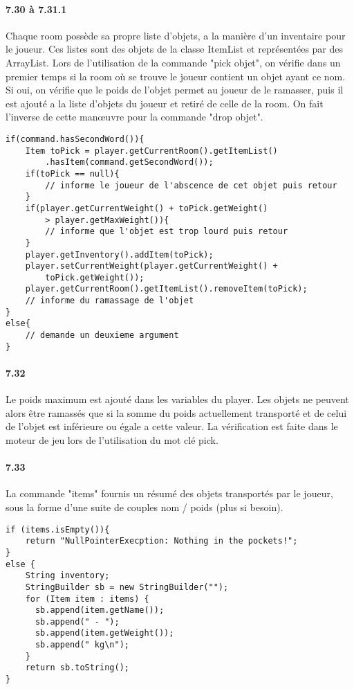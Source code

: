 \documentclass[11pt,a4paper]{report}
\begin{document}
\paragraph{7.30 à 7.31.1}
Chaque room possède sa propre liste d'objets, a la manière d'un inventaire pour le joueur. Ces listes sont des objets de la classe ItemList et représentées par des ArrayList. Lors de l'utilisation de la commande "pick objet", on vérifie dans un premier temps si la room où se trouve le joueur contient un objet ayant ce nom. Si oui, on vérifie que le poids de l'objet permet au joueur de le ramasser, puis il est ajouté a la liste d'objets du joueur et retiré de celle de la room. On fait l'inverse de cette manœuvre pour la commande "drop objet".
\begin{lstlisting}
if(command.hasSecondWord()){
    Item toPick = player.getCurrentRoom().getItemList()
    	.hasItem(command.getSecondWord());
    if(toPick == null){
        // informe le joueur de l'abscence de cet objet puis retour
    }
    if(player.getCurrentWeight() + toPick.getWeight()
    	> player.getMaxWeight()){
        // informe que l'objet est trop lourd puis retour
    }
    player.getInventory().addItem(toPick);
    player.setCurrentWeight(player.getCurrentWeight() +
    	toPick.getWeight());
    player.getCurrentRoom().getItemList().removeItem(toPick);
    // informe du ramassage de l'objet
}
else{
    // demande un deuxieme argument
}
\end{lstlisting}

\paragraph{7.32}
Le poids maximum est ajouté dans les variables du player. Les objets ne peuvent alors être ramassés que si la somme du poids actuellement transporté et de celui de l'objet est inférieure ou égale a cette valeur. La vérification est faite dans le moteur de jeu lors de l'utilisation du mot clé pick.

\paragraph{7.33}
La commande "items" fournis un résumé des objets transportés par le joueur, sous la forme d'une suite de couples nom / poids (plus si besoin).
\begin{lstlisting}
if (items.isEmpty()){
    return "NullPointerExecption: Nothing in the pockets!";
}
else {
    String inventory;
    StringBuilder sb = new StringBuilder("");
    for (Item item : items) {
      sb.append(item.getName());
      sb.append(" - ");
      sb.append(item.getWeight());
      sb.append(" kg\n");
    }
    return sb.toString();
}
\end{lstlisting}
\end{document}

